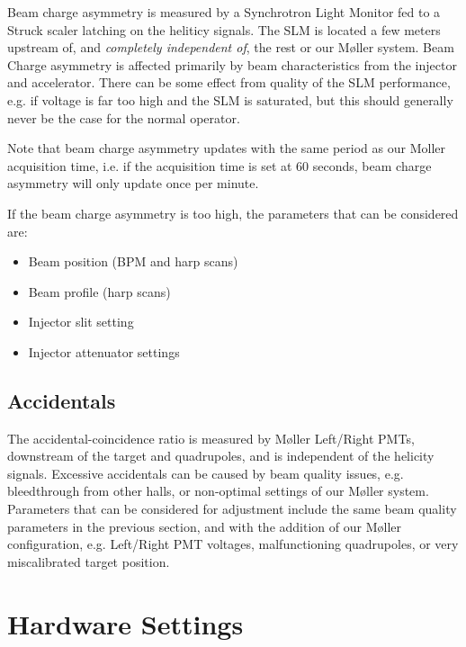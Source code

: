 \documentclass[amsmath,amssymb,notitlepage,12pt]{revtex4}
\begin{document}
Beam charge asymmetry is measured by a Synchrotron Light Monitor fed to a Struck scaler latching on the heliticy signals.  The SLM is located a few meters upstream of, and {\em completely independent of}, the rest or our M{\o}ller system.  Beam Charge asymmetry is affected primarily by beam characteristics from the injector and accelerator.  There can be some effect from quality of the SLM performance, e.g. if voltage is far too high and the SLM is saturated, but this should generally never be the case for the normal operator.

Note that beam charge asymmetry updates with the same period as our Moller acquisition time, i.e. if the acquisition time is set at 60 seconds, beam charge asymmetry will only update once per minute.

If the beam charge asymmetry is too high, the parameters that can be considered are:

\begin{itemize}
\vspace{-4mm}\item Beam position (BPM and harp scans)
\vspace{-4mm}\item Beam profile (harp scans)
\vspace{-4mm}\item Injector slit setting
\vspace{-4mm}\item Injector attenuator settings
\end{itemize}

\subsection{Accidentals}

The accidental-coincidence ratio is measured by M{\o}ller Left/Right PMTs, downstream of the target and quadrupoles, and is independent of the helicity signals.  Excessive accidentals can be caused by beam quality issues, e.g. bleedthrough from other halls, or non-optimal settings of our M{\o}ller system.  Parameters that can be considered for adjustment include the same beam quality parameters in the previous section, and with the addition of our M{\o}ller configuration, e.g. Left/Right PMT voltages, malfunctioning quadrupoles, or very miscalibrated target position.

\section{Hardware Settings}
\end{document}
